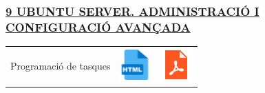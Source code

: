 \documentclass[
  12 pt,
  a4paper,
]{article}
\begin{document}
\subsubsection{\texorpdfstring{\hyperref[U9]{9 UBUNTU SERVER.
ADMINISTRACIÓ I CONFIGURACIÓ
AVANÇADA}}{9 UBUNTU SERVER. ADMINISTRACIÓ I CONFIGURACIÓ AVANÇADA}}\label{ubuntu-server.-administraciuxf3-i-configuraciuxf3-avanuxe7ada}

\begin{longtable}[]{@{}
  >{\raggedright\arraybackslash}p{}
  >{\raggedright\arraybackslash}p{}
  >{\raggedright\arraybackslash}p{}@{}}
\toprule\noalign{}
\endhead
\bottomrule\noalign{}
\endlastfoot
Programació de tasques &
\href{UD9_AVANÇADA/U9-ProgramarTasques.html}{\includegraphics{recursos/iconohtml.png}}
&
\href{UD9_AVANÇADA/U9-ProgramarTasques.pdf}{\includegraphics{recursos/iconopdf.png}} \\
\end{longtable}
\end{document}
